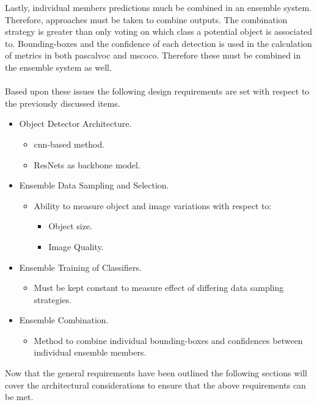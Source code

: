 Lastly, individual members predictions much be combined in an ensemble system. Therefore, approaches must be taken to combine outputs. The combination strategy is greater than only voting on which class a potential object is associated to. Bounding-boxes and the confidence of each detection is used in the calculation of metrics in both \gls{pascalvoc} and \gls{mscoco}. Therefore these must be combined in the ensemble system as well.
\\\\
Based upon these issues the following design requirements are set with respect to the previously discussed items.

\begin{itemize}
	
	\item Object Detector Architecture.
	\begin{itemize}
		\item \gls{cnn}-based method.
		\item ResNets as backbone model.
	\end{itemize}

	\item Ensemble Data Sampling and Selection.
	\begin{itemize}
		\item Ability to measure object and image variations with respect to: 
		\begin{itemize}
			\item Object size.
			\item Image Quality.
		\end{itemize}
	\end{itemize}

	\item Ensemble Training of Classifiers.
	\begin{itemize}
		\item Must be kept constant to measure effect of differing data sampling strategies.
	\end{itemize}

	\item Ensemble Combination.
	\begin{itemize}
		\item Method to combine individual bounding-boxes and confidences between individual ensemble members.
	\end{itemize}
\end{itemize}

Now that the general requirements have been outlined the following sections will cover the architectural considerations to ensure that the above requirements can be met.

